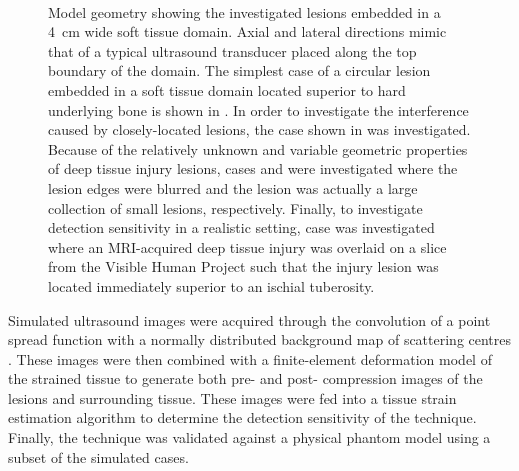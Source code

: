 \begin{figure}[!htb]
{				\label{fig:schematic_blob}
			}
			~
			\caption[Quasi-static model geometries]{Model geometry showing the investigated lesions embedded in a \SI{4}{\cm} wide soft tissue domain. Axial and lateral directions mimic that of a typical ultrasound transducer placed along the top boundary of the domain. The simplest case of a circular lesion embedded in a soft tissue domain located superior to hard underlying bone is shown in \protect{}. In order to investigate the interference caused by closely-located lesions, the case shown in \protect{} was investigated. Because of the relatively unknown and variable geometric properties of deep tissue injury lesions, cases \protect{} and \protect{} were investigated where the lesion edges were blurred and the lesion was actually a large collection of small lesions, respectively. Finally, to investigate detection sensitivity in a realistic setting, case \protect{} was investigated where an MRI-acquired deep tissue injury was overlaid on a slice from the Visible Human Project such that the injury lesion was located immediately superior to an ischial tuberosity.}	
			\label{fig:geometry}
		\end{figure}

		Simulated ultrasound images were acquired through the convolution of a point spread function with a normally distributed background map of scattering centres \cite{bamber80}. These images were then combined with a finite-element deformation model of the strained tissue to generate both pre- and post- compression images of the lesions and surrounding tissue. These images were fed into a tissue strain estimation algorithm to determine the detection sensitivity of the technique. Finally, the technique was validated against a physical phantom model using a subset of the simulated cases.

